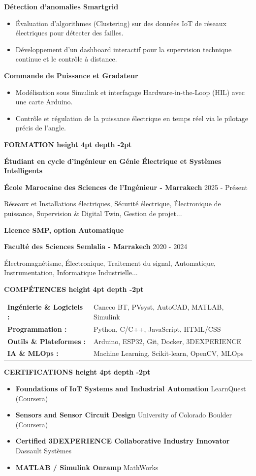 \documentclass[10pt,a4paper]{../altacv}
\renewcommand{\cvsection}[2][]{%
  \medskip%
  {\color{heading}\LARGE\bfseries #2 \hspace{0.2em}\leaders\vrule height 4pt depth -2pt\hfill\mbox{}}\par\smallskip
}
\renewcommand{\cvevent}[4]{%
  {\large\bfseries\color{accent}#1\par}
  \smallskip\normalsize
  \ifstrequal{#2}{}{}{%
    \textbf{\color{emphasis}#2\ifstrequal{#4}{}{}{ - #4}}%
  }%
  \hfill
  \ifstrequal{#3}{}{}{{\small#3}}%
  \par\smallskip
}
\begin{document}
{\large\bfseries\color{accent} Détection d'anomalies Smartgrid}\\[0.05cm]
\begin{itemize}
  \item Évaluation d'algorithmes (Clustering) sur des données IoT de réseaux électriques pour détecter des failles.
  \item Développement d'un dashboard interactif pour la supervision technique continue et le contrôle à distance.
\end{itemize}

{\large\bfseries\color{accent} Commande de Puissance et Gradateur}\\[0.05cm]
\begin{itemize}
  \item Modélisation sous Simulink et interfaçage Hardware-in-the-Loop (HIL) avec une carte Arduino.
  \item Contrôle et régulation de la puissance électrique en temps réel via le pilotage précis de l'angle.
\end{itemize}

\cvsection{FORMATION}
\cvevent{Étudiant en cycle d'ingénieur en Génie Électrique et Systèmes Intelligents}{École Marocaine des Sciences de l'Ingénieur}{2025 - Présent}{Marrakech}
\small Réseaux et Installations électriques, Sécurité électrique, Électronique de puissance, Supervision \& Digital Twin, Gestion de projet...

\cvevent{Licence SMP, option Automatique}{Faculté des Sciences Semlalia}{2020 - 2024}{Marrakech}
\small Électromagnétisme, Électronique, Traitement du signal, Automatique, Instrumentation, Informatique Industrielle...

\cvsection{COMPÉTENCES}
\begin{tabular}{@{}ll@{}}
\textbf{Ingénierie \& Logiciels :} & Caneco BT, PVsyst, AutoCAD, MATLAB, Simulink \\[1pt]
\textbf{Programmation :} & Python, C/C++, JavaScript, HTML/CSS \\[1pt]
\textbf{Outils \& Plateformes :} & Arduino, ESP32, Git, Docker, 3DEXPERIENCE \\[1pt]
\textbf{IA \& MLOps :} & Machine Learning, Scikit-learn, OpenCV, MLOps \\
\end{tabular}

\cvsection{CERTIFICATIONS}
\begin{itemize}[leftmargin=*, label=\textbullet, itemsep=2pt]
  \item \textbf{Foundations of IoT Systems and Industrial Automation} \hfill {\color{emphasis}LearnQuest (Coursera)}
  \item \textbf{Sensors and Sensor Circuit Design} \hfill {\color{emphasis}University of Colorado Boulder (Coursera)}
  \item \textbf{Certified 3DEXPERIENCE Collaborative Industry Innovator} \hfill {\color{emphasis}Dassault Systèmes}
  \item \textbf{MATLAB / Simulink Onramp} \hfill {\color{emphasis}MathWorks}
\end{itemize}
\end{document}
